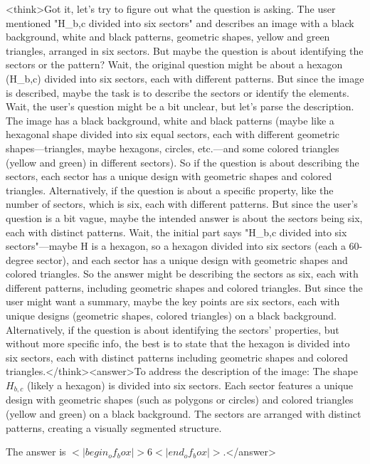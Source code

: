<think>Got it, let's try to figure out what the question is asking. The user mentioned "H_b,c divided into six sectors" and describes an image with a black background, white and black patterns, geometric shapes, yellow and green triangles, arranged in six sectors. But maybe the question is about identifying the sectors or the pattern? Wait, the original question might be about a hexagon (H_b,c) divided into six sectors, each with different patterns. But since the image is described, maybe the task is to describe the sectors or identify the elements. Wait, the user's question might be a bit unclear, but let's parse the description. The image has a black background, white and black patterns (maybe like a hexagonal shape divided into six equal sectors, each with different geometric shapes—triangles, maybe hexagons, circles, etc.—and some colored triangles (yellow and green) in different sectors). So if the question is about describing the sectors, each sector has a unique design with geometric shapes and colored triangles. Alternatively, if the question is about a specific property, like the number of sectors, which is six, each with different patterns. But since the user's question is a bit vague, maybe the intended answer is about the sectors being six, each with distinct patterns. Wait, the initial part says "H_b,c divided into six sectors"—maybe H is a hexagon, so a hexagon divided into six sectors (each a 60-degree sector), and each sector has a unique design with geometric shapes and colored triangles. So the answer might be describing the sectors as six, each with different patterns, including geometric shapes and colored triangles. But since the user might want a summary, maybe the key points are six sectors, each with unique designs (geometric shapes, colored triangles) on a black background. Alternatively, if the question is about identifying the sectors' properties, but without more specific info, the best is to state that the hexagon is divided into six sectors, each with distinct patterns including geometric shapes and colored triangles.</think><answer>To address the description of the image: The shape \( H_{b,c} \) (likely a hexagon) is divided into six sectors. Each sector features a unique design with geometric shapes (such as polygons or circles) and colored triangles (yellow and green) on a black background. The sectors are arranged with distinct patterns, creating a visually segmented structure.  

The answer is \(<|begin_of_box|>6<|end_of_box|>\).</answer>